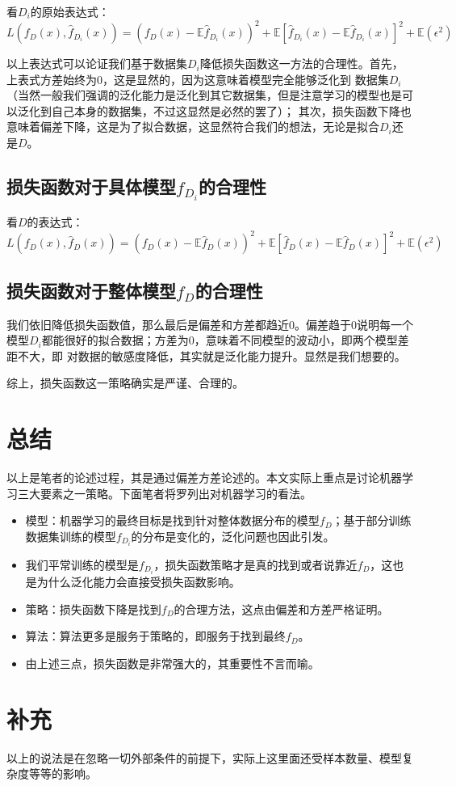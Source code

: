 \documentclass{article}
\begin{document}
    看$D_i$的原始表达式：
    \[L(f_D(x),\widehat{f}_{D_i}(x))=(f_D(x)-\mathbb{E}\widehat{f}_{D_i}(x))^2+\mathbb{E}[\widehat{f}_{D_i}(x)-\mathbb{E}\widehat{f}_{D_i}(x)]^2+\mathbb{E}(\epsilon^2)\]

    以上表达式可以论证我们基于数据集$D_i$降低损失函数这一方法的合理性。首先，上表式方差始终为0，这是显然的，因为这意味着模型完全能够泛化到
    数据集$D_i$（当然一般我们强调的泛化能力是泛化到其它数据集，但是注意学习的模型也是可以泛化到自己本身的数据集，不过这显然是必然的罢了）；
    其次，损失函数下降也意味着偏差下降，这是为了拟合数据，这显然符合我们的想法，无论是拟合$D_i$还是$D$。
    \subsection*{损失函数对于具体模型$f_{D_i}$的合理性}
    看$D$的表达式：
    \[L(f_D(x),\widehat{f}_D(x))=(f_D(x)-\mathbb{E}\widehat{f}_D(x))^2+\mathbb{E}[\widehat{f}_D(x)-\mathbb{E}\widehat{f}_D(x)]^2+\mathbb{E}(\epsilon^2)\]

    \subsection*{损失函数对于整体模型$f_D$的合理性}
    我们依旧降低损失函数值，那么最后是偏差和方差都趋近0。偏差趋于0说明每一个模型$D_i$都能很好的拟合数据；方差为0，意味着不同模型的波动小，即两个模型差距不大，即
    对数据的敏感度降低，其实就是泛化能力提升。显然是我们想要的。

    综上，损失函数这一策略确实是严谨、合理的。

    \section{总结}
    以上是笔者的论述过程，其是通过偏差方差论述的。本文实际上重点是讨论机器学习三大要素之一策略。下面笔者将罗列出对机器学习的看法。

    \begin{itemize}
        \item 模型：机器学习的最终目标是找到针对整体数据分布的模型$f_D$；基于部分训练数据集训练的模型$f_{D_i}$的分布是变化的，泛化问题也因此引发。
        \item 我们平常训练的模型是$f_{D_i}$，损失函数策略才是真的找到或者说靠近$f_D$，这也是为什么泛化能力会直接受损失函数影响。
        \item 策略：损失函数下降是找到$f_D$的合理方法，这点由偏差和方差严格证明。
        \item 算法：算法更多是服务于策略的，即服务于找到最终$f_D$。
        \item 由上述三点，损失函数是非常强大的，其重要性不言而喻。
    \end{itemize}

    \section*{补充}
    以上的说法是在忽略一切外部条件的前提下，实际上这里面还受样本数量、模型复杂度等等的影响。
\end{document}
